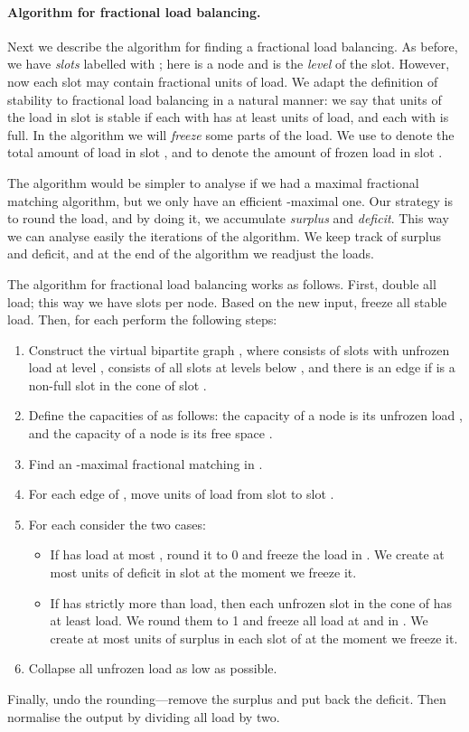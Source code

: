 \paragraph{Algorithm for fractional load balancing.}

Next we describe the algorithm for finding a fractional load balancing. As before, we have \emph{slots} labelled with ; here  is a node and  is the \emph{level} of the slot. However, now each slot may contain fractional units of load. We adapt the definition of stability to fractional load balancing in a natural manner: we say that  units of the load in slot  is stable if each  with  has at least  units of load, and each  with  is full. In the algorithm we will \emph{freeze} some parts of the load. We use  to denote the total amount of load in slot , and  to denote the amount of frozen load in slot . 

The algorithm would be simpler to analyse if we had a maximal fractional matching algorithm, but we only have an efficient -maximal one. Our strategy is to round the load, and by doing it, we accumulate \emph{surplus} and \emph{deficit}. This way we can analyse easily the iterations of the algorithm. We keep track of surplus and deficit, and at the end of the algorithm we readjust the loads.

The algorithm for fractional load balancing works as follows. First, double all load; this way we have  slots per node. Based on the new input, freeze all stable load. Then, for each  perform the following steps:
\begin{enumerate}
    \item Construct the virtual bipartite graph , where  consists of slots with unfrozen load at level ,  consists of all slots at levels below , and there is an edge  if  is a non-full slot in the cone of slot .
    \item Define the capacities of  as follows: the capacity of a node  is its unfrozen load , and the capacity of a node  is its free space .
    \item Find an -maximal fractional matching  in .
    \item\label{step:move} For each edge  of , move  units of load from slot  to slot .
    \item\label{step:freeze} For each  consider the two cases:
    \begin{itemize}
        \item If  has load at most , round it to 0 and freeze the load in . We create at most  units of deficit in slot  at the moment we freeze it.
        \item If  has strictly more than  load, then each unfrozen slot in the cone of  has at least  load. We round them to 1 and freeze all load at  and in . We create at most  units of surplus in each slot of  at the moment we freeze it.
    \end{itemize}
    \item Collapse all unfrozen load as low as possible.
\end{enumerate}
Finally, undo the rounding---remove the surplus and put back the deficit. Then normalise the output by dividing all load by two.

